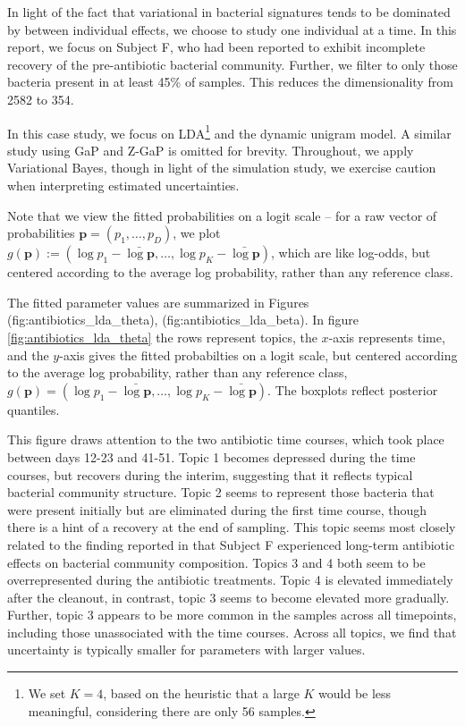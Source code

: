 \documentclass[oupdraft]{bio}
\begin{document}
In light of the fact that variational in bacterial signatures tends to be
dominated by between individual effects, we choose to study one individual at a
time. In this report, we focus on Subject F, who had been reported to exhibit
incomplete recovery of the pre-antibiotic bacterial community. Further, we
filter to only those bacteria present in at least 45\% of samples. This reduces
the dimensionality from 2582 to 354.

In this case study, we focus on LDA\footnote{We set $K = 4$, based on the
  heuristic that a large $K$ would be less meaningful, considering there are
  only 56 samples.} and the dynamic unigram model. A similar study using GaP and
Z-GaP is omitted for brevity. Throughout, we apply Variational Bayes, though in
light of the simulation study, we exercise caution when interpreting estimated
uncertainties.

Note that we view the fitted probabilities on a logit scale -- for a raw vector
of probabilities $\mathbf{p} = \left(p_{1}, \dots, p_{D}\right)$, we plot
$g\left(\mathbf{p}\right) := \left(\log p_{1} - \bar{\log \mathbf{p}}, \dots,
\log p_{K} - \bar{\log \mathbf{p}}\right)$, which are like log-odds, but
centered according to the average log probability, rather than any reference
class.

The fitted parameter values are summarized in Figures
\@ref(fig:antibiotics_lda_theta), \@ref(fig:antibiotics_lda_beta).
In figure \ref{fig:antibiotics_lda_theta} the rows represent topics, the
$x$-axis represents time, and the $y$-axis gives the fitted probabilties on a
logit scale, but centered according to the average log probability, rather than
any reference class, $g\left(\mathbf{p}\right) = \left(\log p_{1} - \bar{\log
  \mathbf{p}}, \dots, \log p_{K} - \bar{\log \mathbf{p}}\right)$. The boxplots
reflect posterior quantiles.

This figure draws attention to the two antibiotic time courses, which took place
between days 12-23 and 41-51. Topic 1 becomes depressed during the time courses,
but recovers during the interim, suggesting that it reflects typical bacterial
community structure. Topic 2 seems to represent those bacteria that were present
initially but are eliminated during the first time course, though there is a
hint of a recovery at the end of sampling. This topic seems most closely related
to the finding reported in \citep{dethlefsen2011incomplete} that Subject F
experienced long-term antibiotic effects on bacterial community composition.
Topics 3 and 4 both seem to be overrepresented during the antibiotic treatments.
Topic 4 is elevated immediately after the cleanout, in contrast, topic 3 seems
to become elevated more gradually. Further, topic 3 appears to be more common in
the samples across all timepoints, including those unassociated with the time
courses. Across all topics, we find that uncertainty is typically smaller for
parameters with larger values.
\end{document}
